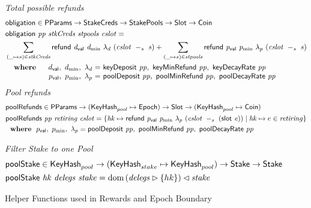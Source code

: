 \begin{figure}[htb]
  \emph{Total possible refunds}
  \begin{align*}
    & \fun{obligation} \in \PParams \to \StakeCreds \to \StakePools \to \Slot \to \Coin \\
    & \obligation{pp}{stkCreds}{stpools}{cslot} =\\
    & \sum\limits_{(\_ \mapsto s) \in \var{stkCreds}}
      \refund{d_{\mathsf{val}}}{d_{\min}}{\lambda_d}{(\slotminus{cslot}{s})}
      + \sum\limits_{(\_ \mapsto s) \in \var{stpools}}
      \refund{p_{\mathsf{val}}}{p_{\min}}{\lambda_p}{(\slotminus{cslot}{s})} \\
    &
      \begin{array}{lr@{~=~}l}
        \where
          & \dval,~d_{\min},~\lambda_d
          & \fun{keyDeposit}~\var{pp},~\fun{keyMinRefund}~\var{pp},~\fun{keyDecayRate}~\var{pp}
          \\
          & p_{\mathsf{val}},~p_{\min},~\lambda_p
          & \fun{poolDeposit}~\var{pp},~\fun{poolMinRefund}~\var{pp},~\fun{poolDecayRate}~\var{pp}
      \end{array}\\
  \end{align*}
  \emph{Pool refunds}
  \begin{align*}
      & \mathsf{poolRefunds} \in \mathsf{PParams} \to (\mathsf{KeyHash}_{pool} \mapsto \mathsf{Epoch}) \to \mathsf{Slot} \to
      (\mathsf{KeyHash}_{pool} \mapsto \mathsf{Coin}) \\
      & \mathsf{poolRefunds}~ \mathit{pp}~ \mathit{retiring}~ \mathit{cslot} = \left\{
        \mathit{hk}\mapsto
          \mathsf{refund}~ \mathit{p_{\mathsf{val}}}~ \mathit{p_{\min}}~ {\lambda_p}~ {(\mathit{cslot}~-_{s}~\mathit{(\mathsf{slot}~e)})}
          \mid
          \mathit{hk}\mapsto e\in\mathit{retiring}
        \right\}\\
      & ~ ~ \mathbf{where}~ ~  p_{\mathsf{val}},~p_{\min},~\lambda_p =
          \mathsf{poolDeposit}~\mathit{pp},~\mathsf{poolMinRefund}~\mathit{pp},~\mathsf{poolDecayRate}~\mathit{pp} \\
  \end{align*}

  \emph{Filter Stake to one Pool}
  \begin{align*}
      & \mathsf{poolStake} \in \mathsf{KeyHash}_{pool} \to (\mathsf{KeyHash}_{stake} \mapsto \mathsf{KeyHash}_{pool})
        \to \mathsf{Stake} \to \mathsf{Stake} \\
      & \mathsf{poolStake}~ \mathit{hk}~ \mathit{delegs}~ \mathit{stake} =
        \operatorname{dom}{(\mathit{delegs}\rhd\{hk\})\lhd\mathit{stake}}
  \end{align*}

  \caption{Helper Functions used in Rewards and Epoch Boundary}
  \label{fig:funcs:epoch-helper-rewards}
\end{figure}


